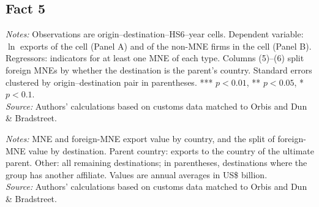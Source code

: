 \documentclass[11pt,a4paper]{article}
\begin{document}
\subsection*{Fact 5}
\begin{table}[H]\centering\small%
  \caption{Multinational Presence and Exports: Extensive Margin, by Type of Multinational}%
  \label{tab:a_ext}%
  \par\vspace{3pt}%
  \begin{minipage}{0.95\textwidth}\footnotesize %
  \textit{Notes:} Observations are origin--destination--HS6--year cells. Dependent variable: $\ln$ exports of the cell (Panel A) and of the non-MNE firms in the cell (Panel B). Regressors: indicators for at least one MNE of each type. Columns (5)--(6) split foreign MNEs by whether the destination is the parent's country. Standard errors clustered by origin--destination pair in parentheses. *** $p<0.01$, ** $p<0.05$, * $p<0.1$.\\[3pt]%
  \textit{Source:} Authors' calculations based on customs data matched to Orbis and Dun \& Bradstreet.%
  \end{minipage}%
  \end{table}
\begin{table}[H]\centering\small%
  \caption{Multinational Exports by Exporting Country and Destination Type}%
  \label{tab:a_pres}%
  \par\vspace{3pt}%
  \begin{minipage}{0.95\textwidth}\footnotesize %
  \textit{Notes:} MNE and foreign-MNE export value by country, and the split of foreign-MNE value by destination. Parent country: exports to the country of the ultimate parent. Other: all remaining destinations; in parentheses, destinations where the group has another affiliate. Values are annual averages in US\$ billion.\\[3pt]%
  \textit{Source:} Authors' calculations based on customs data matched to Orbis and Dun \& Bradstreet.%
  \end{minipage}%
  \end{table}
\end{document}
